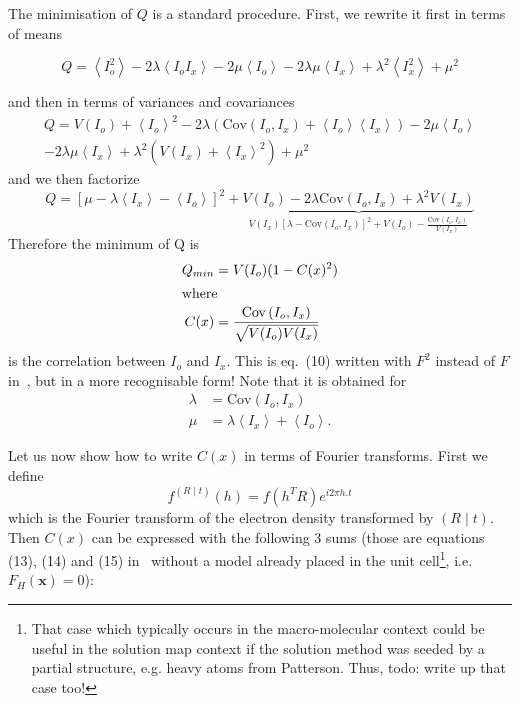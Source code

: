 \documentclass[11pt]{article}
\newcommand{\mean}[1]{\left\langle #1 \right\rangle}
\newcommand{\sym}[2]{\left( #1 \mid #2 \right)}
\newcommand{\cov}[2]{\mathrm{Cov}\left(#1,#2\right)}
\begin{document}
The minimisation of $Q$ is a standard procedure. First, we rewrite it first in terms of means

\begin{equation*}
Q = \mean{I_o^2} -2\lambda\mean{I_o I_x} -2\mu\mean{I_o} -2\lambda\mu\mean{I_x} + \lambda^2\mean{I_x^2} + \mu^2
\end{equation*}

and then in terms of variances and covariances
\begin{equation*}
\begin{split}
Q = V(I_o) + \mean{I_o}^2 -2\lambda(\cov{I_o}{I_x} + \mean{I_o}\mean{I_x}) -2\mu\mean{I_o}
\\
-2\lambda\mu \mean{I_x} + \lambda^2(V(I_x) + \mean{I_x}^2) + \mu^2
\end{split}
\end{equation*}
and we then factorize
\begin{equation*}
Q = [\mu - \lambda \mean{I_x} - \mean{I_o}]^2 + \underbrace{V(I_o) - 2\lambda\cov{I_o}{I_x} + \lambda^2V(I_x)}_{\displaystyle V(I_x)[\lambda - \cov{I_o}{I_x}]^2 + V(I_o) - \frac{\cov{I_o}{I_x}}{V(I_x)}}
\end{equation*}
Therefore the minimum of Q is
\begin{align}
Q_{min} &= V(I_o)(1-C(x)^2)\\
\intertext{where}
C(x) &= \frac{\cov{I_o}{I_x}}{\sqrt{V(I_o)V(I_x)}}
\end{align}
is the correlation between $I_o$ and $I_x$. This is eq.~(10) written with $F^2$ instead of $F$ in~\cite{J.Navaza:1995}, but in a more recognisable form! Note that it is obtained for
\begin{align}
\lambda &= \cov{I_o}{I_x}\\
\mu &= \lambda\mean{I_x} + \mean{I_o}. 
\end{align}

Let us now show how to write $C(x)$ in terms of Fourier transforms. First we define
\begin{equation}
f^{\sym{R}{t}}(h) = f(h^T R) e^{i2\pi h.t}
\end{equation}
which is the Fourier transform of the electron density transformed by $\sym{R}{t}$.
Then $C(x)$ can be expressed with the following 3 sums (those are equations (13), (14) and (15) in~\cite{J.Navaza:1995} without a model already placed in the unit cell\footnote{That case which typically occurs in the macro-molecular context could be useful in the solution map context if the solution method was seeded by a partial structure, e.g. heavy atoms from Patterson. Thus, todo: write up that case too!}, i.e. $F_H(\mathbf{x}) = 0$):
\end{document}

